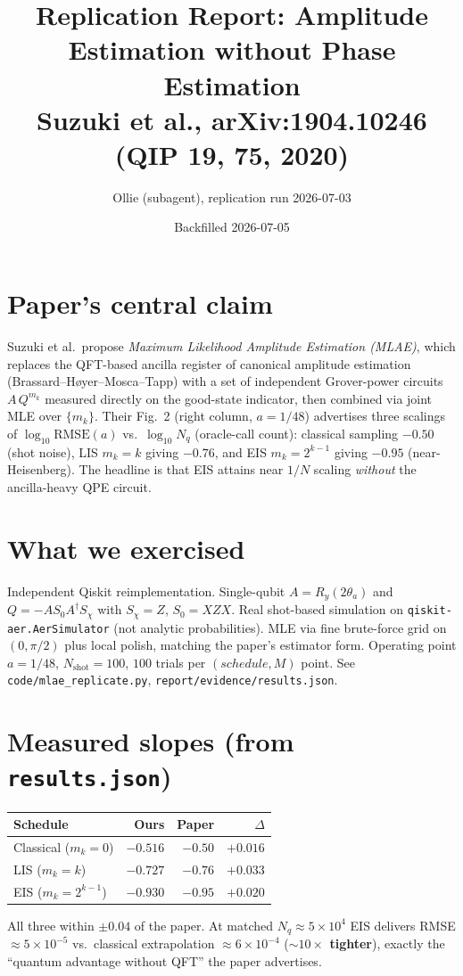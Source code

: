 \documentclass[11pt]{article}
\title{Replication Report: Amplitude Estimation without Phase Estimation\\
\large Suzuki et al., arXiv:1904.10246 (QIP 19, 75, 2020)}
\author{Ollie (subagent), replication run 2026-07-03}
\date{Backfilled 2026-07-05}
\begin{document}
\maketitle

\section{Paper's central claim}
Suzuki et al.\ propose \emph{Maximum Likelihood Amplitude Estimation (MLAE)},
which replaces the QFT-based ancilla register of canonical amplitude estimation
(Brassard--H\o yer--Mosca--Tapp) with a set of independent Grover-power circuits
$A \, Q^{m_k}$ measured directly on the good-state indicator, then combined via
joint MLE over $\{m_k\}$.  Their Fig.\ 2 (right column, $a=1/48$) advertises
three scalings of $\log_{10}\mathrm{RMSE}(a)$ vs.\ $\log_{10} N_q$ (oracle-call
count): classical sampling $-0.50$ (shot noise), LIS $m_k=k$ giving $-0.76$,
and EIS $m_k=2^{k-1}$ giving $-0.95$ (near-Heisenberg).  The headline is that
EIS attains near $1/N$ scaling \emph{without} the ancilla-heavy QPE circuit.

\section{What we exercised}
Independent Qiskit reimplementation.  Single-qubit $A = R_y(2\theta_a)$ and
$Q = -A S_0 A^{\dagger} S_{\chi}$ with $S_{\chi}=Z$, $S_0 = XZX$.  Real
shot-based simulation on \texttt{qiskit-aer.AerSimulator} (not analytic
probabilities).  MLE via fine brute-force grid on $(0,\pi/2)$ plus local
polish, matching the paper's estimator form.  Operating point $a=1/48$,
$N_{\text{shot}}=100$, $100$ trials per $(schedule, M)$ point.  See
\texttt{code/mlae\_replicate.py}, \texttt{report/evidence/results.json}.

\section{Measured slopes (from \texttt{results.json})}
\begin{center}
\begin{tabular}{lrrr}
\toprule
Schedule & Ours & Paper & $\Delta$ \\
\midrule
Classical ($m_k=0$)       & $-0.516$ & $-0.50$ & $+0.016$ \\
LIS ($m_k=k$)             & $-0.727$ & $-0.76$ & $+0.033$ \\
EIS ($m_k=2^{k-1}$)       & $-0.930$ & $-0.95$ & $+0.020$ \\
\bottomrule
\end{tabular}
\end{center}
All three within $\pm 0.04$ of the paper. At matched $N_q \approx 5\times 10^4$
EIS delivers RMSE $\approx 5\times 10^{-5}$ vs.\ classical extrapolation
$\approx 6\times 10^{-4}$ (\textbf{$\sim 10\times$ tighter}), exactly the
``quantum advantage without QFT'' the paper advertises.
\end{document}
